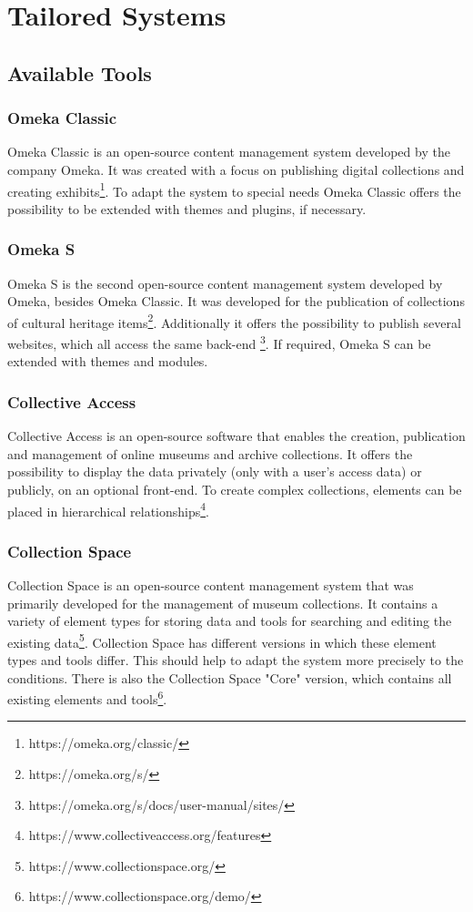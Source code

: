 \section{Tailored Systems}

\subsection{Available Tools}

\subsubsection{Omeka Classic}
Omeka Classic is an open-source content management system developed by the company Omeka. It was created with a focus on publishing digital collections and creating exhibits\footnote{https://omeka.org/classic/}. To adapt the system to special needs Omeka Classic offers the possibility to be extended with themes and plugins, if necessary.

\subsubsection{Omeka S}
Omeka S is the second open-source content management system developed by Omeka, besides Omeka Classic. It was developed for the publication of collections of cultural heritage items\footnote{https://omeka.org/s/}. Additionally it offers the possibility to publish several websites, which all access the same back-end \footnote{https://omeka.org/s/docs/user-manual/sites/}. If required, Omeka S can be extended with themes and modules.

\subsubsection{Collective Access}
Collective Access is an open-source software that enables the creation, publication and management of online museums and archive collections. It offers the possibility to display the data privately (only with a user's access data) or publicly, on an optional front-end. To create complex collections, elements can be placed in hierarchical relationships\footnote{https://www.collectiveaccess.org/features}.

\subsubsection{Collection Space}
Collection Space is an open-source content management system that was primarily developed for the management of museum collections. It contains a variety of element types for storing data and tools for searching and editing the existing data\footnote{https://www.collectionspace.org/}. Collection Space has different versions in which these element types and tools differ. This should help to adapt the system more precisely to the conditions. There is also the Collection Space "Core" version, which contains all existing elements and tools\footnote{https://www.collectionspace.org/demo/}.

